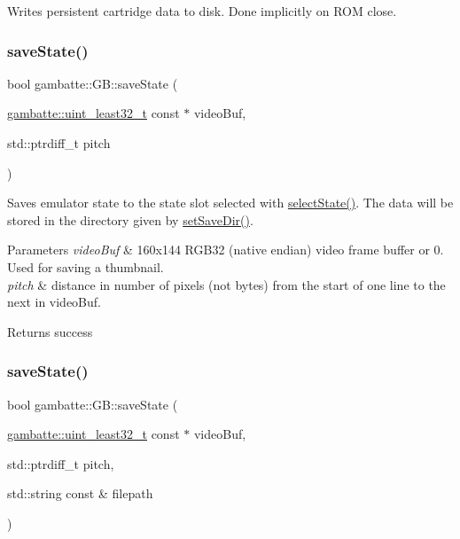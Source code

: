 Writes persistent cartridge data to disk. Done implicitly on R\+OM close. \mbox{\label{classgambatte_1_1GB_a4762c3580bafcdd7635988ee8b034869}} 
\subsubsection{\texorpdfstring{save\+State()}{saveState()}\hspace{0.1cm}{\footnotesize\ttfamily [1/4]}}
{\footnotesize\ttfamily bool gambatte\+::\+G\+B\+::save\+State (\begin{DoxyParamCaption}\item[{\hyperlink{namespacegambatte_a0639f09fccfbbd5a8e0796318768e370}{gambatte\+::uint\+\_\+least32\+\_\+t} const $\ast$}]{video\+Buf,  }\item[{std\+::ptrdiff\+\_\+t}]{pitch }\end{DoxyParamCaption})}

Saves emulator state to the state slot selected with \hyperlink{classgambatte_1_1GB_a231371a6ef7aa0001afa45d645052569}{select\+State()}. The data will be stored in the directory given by \hyperlink{classgambatte_1_1GB_ae5d14de04bb821ccdc2bc4d4dbc649c2}{set\+Save\+Dir()}.


\begin{DoxyParams}{Parameters}
{\em video\+Buf} & 160x144 R\+G\+B32 (native endian) video frame buffer or 0. Used for saving a thumbnail. \\
\hline
{\em pitch} & distance in number of pixels (not bytes) from the start of one line to the next in video\+Buf. \\
\hline
\end{DoxyParams}
\begin{DoxyReturn}{Returns}
success 
\end{DoxyReturn}
\mbox{\label{classgambatte_1_1GB_a98b621fc4632d6c815c6eeb31a59d972}} 
\subsubsection{\texorpdfstring{save\+State()}{saveState()}\hspace{0.1cm}{\footnotesize\ttfamily [2/4]}}
{\footnotesize\ttfamily bool gambatte\+::\+G\+B\+::save\+State (\begin{DoxyParamCaption}\item[{\hyperlink{namespacegambatte_a0639f09fccfbbd5a8e0796318768e370}{gambatte\+::uint\+\_\+least32\+\_\+t} const $\ast$}]{video\+Buf,  }\item[{std\+::ptrdiff\+\_\+t}]{pitch,  }\item[{std\+::string const \&}]{filepath }\end{DoxyParamCaption})}

